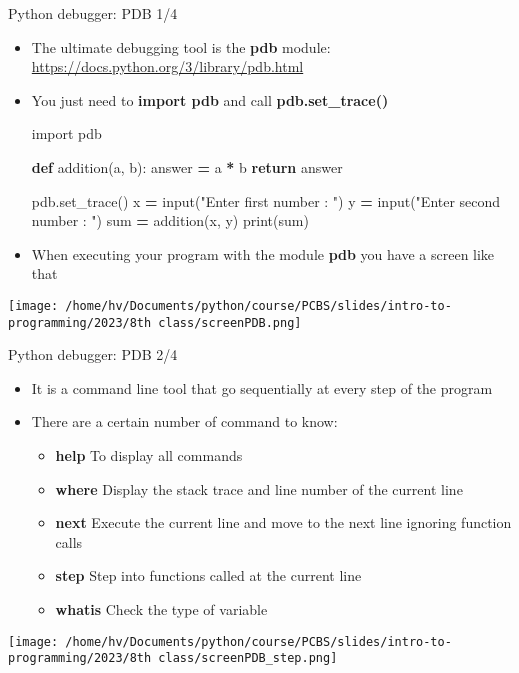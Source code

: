 \documentclass[
  8pt,
  ignorenonframetext,
]{beamer}
\newenvironment{Shaded}{\begin{snugshade}}{\end{snugshade}}
\newcommand{\BuiltInTok}[1]{#1}
\newcommand{\ControlFlowTok}[1]{\textcolor[rgb]{0.13,0.29,0.53}{\textbf{#1}}}
\newcommand{\ImportTok}[1]{#1}
\newcommand{\KeywordTok}[1]{\textcolor[rgb]{0.13,0.29,0.53}{\textbf{#1}}}
\newcommand{\NormalTok}[1]{#1}
\newcommand{\OperatorTok}[1]{\textcolor[rgb]{0.81,0.36,0.00}{\textbf{#1}}}
\newcommand{\StringTok}[1]{\textcolor[rgb]{0.31,0.60,0.02}{#1}}
\providecommand{\tightlist}{%
  \setlength{\itemsep}{0pt}\setlength{\parskip}{0pt}}
\begin{document}
\begin{frame}[fragile]{Python debugger: PDB 1/4}
\protect\hypertarget{python-debugger-pdb-14}{}
\begin{itemize}
\item
  The ultimate debugging tool is the \textbf{pdb} module:
  \url{https://docs.python.org/3/library/pdb.html}
\item
  You just need to \textbf{import pdb} and call
  \textbf{pdb.set\_trace()}

\begin{Shaded}
\begin{Highlighting}[]
\ImportTok{import}\NormalTok{ pdb}

\KeywordTok{def}\NormalTok{ addition(a, b):}
\NormalTok{    answer }\OperatorTok{=}\NormalTok{ a }\OperatorTok{*}\NormalTok{ b}
    \ControlFlowTok{return}\NormalTok{ answer}

\NormalTok{pdb.set\_trace()}
\NormalTok{x }\OperatorTok{=} \BuiltInTok{input}\NormalTok{(}\StringTok{"Enter first number : "}\NormalTok{)}
\NormalTok{y }\OperatorTok{=} \BuiltInTok{input}\NormalTok{(}\StringTok{"Enter second number : "}\NormalTok{)}
\BuiltInTok{sum} \OperatorTok{=}\NormalTok{ addition(x, y)}
\BuiltInTok{print}\NormalTok{(}\BuiltInTok{sum}\NormalTok{)}
\end{Highlighting}
\end{Shaded}
\item
  When executing your program with the module \textbf{pdb} you have a
  screen like that
\end{itemize}

\texttt{[image: /home/hv/Documents/python/course/PCBS/slides/intro-to-programming/2023/8th class/screenPDB.png]}
\end{frame}

\begin{frame}{Python debugger: PDB 2/4}
\protect\hypertarget{python-debugger-pdb-24}{}
\begin{itemize}
\item
  It is a command line tool that go sequentially at every step of the
  program
\item
  There are a certain number of command to know:

  \begin{itemize}
  \tightlist
  \item
    \textbf{help} To display all commands
  \item
    \textbf{where} Display the stack trace and line number of the
    current line
  \item
    \textbf{next} Execute the current line and move to the next line
    ignoring function calls
  \item
    \textbf{step} Step into functions called at the current line
  \item
    \textbf{whatis} Check the type of variable
  \end{itemize}
\end{itemize}

\texttt{[image: /home/hv/Documents/python/course/PCBS/slides/intro-to-programming/2023/8th class/screenPDB\_step.png]}
\end{frame}
\end{document}
